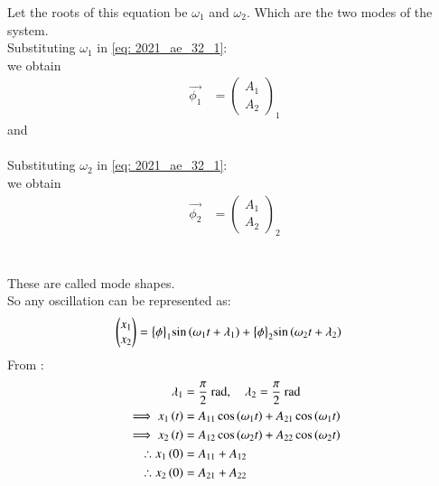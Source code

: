 \documentclass[journal,12pt,twocolumn]{IEEEtran}
\theoremstyle{remark}
\begin{document}
Let the roots of this equation be $ \omega_1$ and $ \omega_2$. Which are the two modes of the system.\\
Substituting $ \omega_1$ in \eqref{eq: 2021_ae_32_1}:\\
we obtain 
\begin{align}
 \vec{\phi_1}&= \begin{pmatrix}
A_1\\
A_2
\end{pmatrix}_1
\end{align}
and \\\\
Substituting $ \omega_2$ in \eqref{eq: 2021_ae_32_1}:\\
we obtain 
\begin{align}
 \vec{\phi_2}&=\begin{pmatrix}
A_1\\
A_2
\end{pmatrix}_2 
\end{align}
\\\\
These are called mode shapes.\\
So any oscillation can be represented as:
\begin{align}
\begin{pmatrix}
x_1\\
x_2
\end{pmatrix}
&= \bigl\{ \phi \bigl\}_1\sin{\ensuremath{\left(\omega_1 t+\lambda_1\right)}} +\bigl\{ \phi \bigl\}_2\sin{\ensuremath{\left(\omega_2 t+\lambda_2\right)}}
\end{align}
From :
\begin{align}
\lambda_1 &= \frac{\pi}{2}\text{ rad}, \quad \lambda_2=\frac{\pi}{2}\text{ rad}\\
\implies x_1\left(t\right)&= A_{11}\cos{\ensuremath{\left(\omega_1 t\right)}} + A_{21}\cos{\ensuremath{\left(\omega_1 t\right)}}\\
\implies x_2\left(t\right)&= A_{12}\cos{\ensuremath{\left(\omega_2 t\right)}} + A_{22}\cos{\ensuremath{\left(\omega_2 t\right)}}\\
\therefore x_1\left(0\right) &= A_{11} + A_{12}\\
\therefore x_2\left(0\right) &= A_{21} + A_{22}
\end{align}
\end{document}

